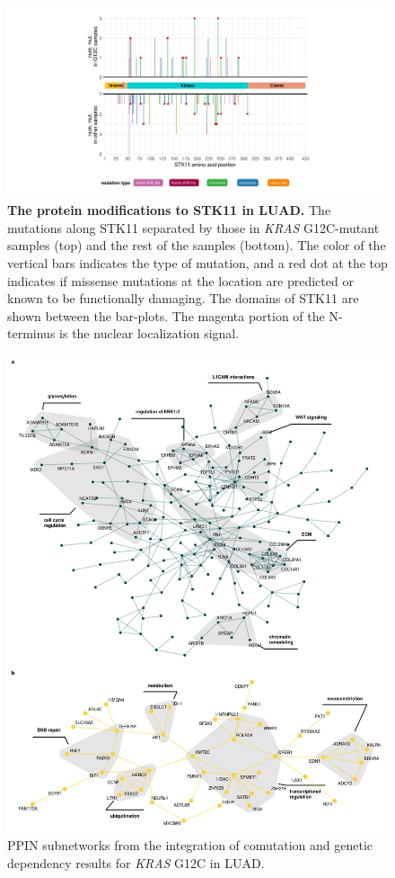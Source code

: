 \documentclass[english, 10pt, letterpaper]{article}
\newcommand{\KRAS}{\emph{KRAS}}
\begin{document}
\begin{figure}[h!]
\centering
\includegraphics[width=180mm]{figures/Supp_Fig_10.jpeg}
\caption{
    \textbf{The protein modifications to STK11 in LUAD.}
    The mutations along STK11 separated by those in \KRAS{} G12C-mutant samples (top) and the rest of the samples (bottom). The color of the vertical bars indicates the type of mutation, and a red dot at the top indicates if missense mutations at the location are predicted or known to be functionally damaging. The domains of STK11 are shown between the bar-plots. The magenta portion of the N-terminus is the nuclear localization signal.
}
\label{sfig:stk11-mutation-lollipop}
\end{figure}
\newpage


\begin{figure}[h!]
\centering
\includegraphics[width=177mm]{figures/Supp_Fig_11.jpeg}
\caption{PPIN subnetworks from the integration of comutation and genetic dependency results for \KRAS{} G12C in LUAD.}
\label{sfig:luad-integrated-ppin}
\end{figure}
\newpage
\end{document}
